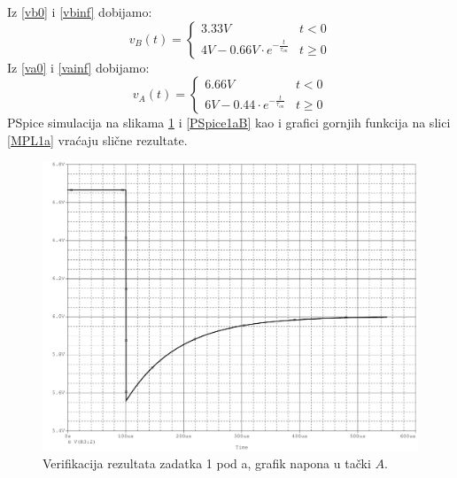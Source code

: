 \documentclass{article}
\begin{document}
                Iz \eqref{vb0} i \eqref{vbinf} dobijamo:
                $$v_B(t) = \left\{ \begin{array}{ll}
                    3.33V & t < 0 \\
                    4V - 0.66V \cdot e^{-\frac{t}{\tau_{on}}} & t \geq 0
                \end{array}\right.$$
                Iz \eqref{va0} i \eqref{vainf} dobijamo:
                $$v_A(t) = \left\{ \begin{array}{ll}
                    6.66V & t < 0 \\
                    6V - 0.44 \cdot e^{-\frac{t}{\tau_{on}}} & t \geq 0
                \end{array}\right.$$
                PSpice simulacija na slikama \ref{PSpice1aA} i \ref{PSpice1aB} kao i grafici gornjih funkcija na slici \ref{MPL1a} vraćaju slične rezultate.
                \begin{figure}[H]
                    \centering
                    \includegraphics[width=\textwidth,height=\textheight,keepaspectratio]{DZ1-1aA.pdf}
                    \caption{Verifikacija rezultata zadatka 1 pod a, grafik napona u tački $A$.}
                    \label{PSpice1aA}
                \end{figure}
\end{document}
